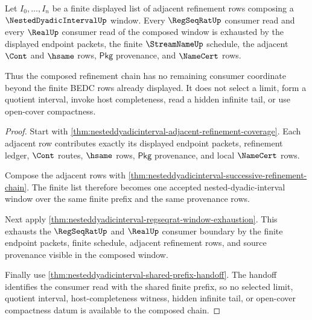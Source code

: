 \begin{theorem}
\label{thm:nesteddyadicinterval-refinement-composition-exhaustion}
Let $I_0,\ldots,I_n$ be a finite displayed list of adjacent refinement rows
composing a $\NestedDyadicIntervalUp$ window. Every $\RegSeqRatUp$ consumer read
and every $\RealUp$ consumer read of the composed window is exhausted by the
displayed endpoint packets, the finite $\StreamNameUp$ schedule, the adjacent
$\Cont$ and $\hsame$ rows, $\mathsf{Pkg}$ provenance, and $\NameCert$ rows.

Thus the composed refinement chain has no remaining consumer coordinate beyond
the finite BEDC rows already displayed. It does not select a limit, form a
quotient interval, invoke host completeness, read a hidden infinite tail, or use
open-cover compactness.
\end{theorem}
\begin{proof}
Start with
\autoref{thm:nesteddyadicinterval-adjacent-refinement-coverage}. Each adjacent
row contributes exactly its displayed endpoint packets, refinement ledger,
$\Cont$ routes, $\hsame$ rows, $\mathsf{Pkg}$ provenance, and local
$\NameCert$ rows.

Compose the adjacent rows with
\autoref{thm:nesteddyadicinterval-successive-refinement-chain}. The finite list
therefore becomes one accepted nested-dyadic-interval window over the same
finite prefix and the same provenance rows.

Next apply
\autoref{thm:nesteddyadicinterval-regseqrat-window-exhaustion}. This exhausts
the $\RegSeqRatUp$ and $\RealUp$ consumer boundary by the finite endpoint
packets, finite schedule, adjacent refinement rows, and source provenance
visible in the composed window.

Finally use \autoref{thm:nesteddyadicinterval-shared-prefix-handoff}. The
handoff identifies the consumer read with the shared finite prefix, so no
selected limit, quotient interval, host-completeness witness, hidden infinite
tail, or open-cover compactness datum is available to the composed chain.
\end{proof}

